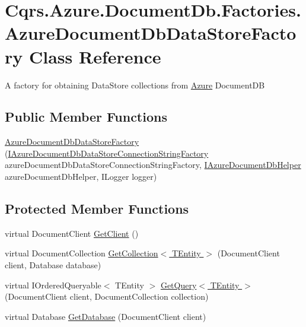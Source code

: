 \hypertarget{classCqrs_1_1Azure_1_1DocumentDb_1_1Factories_1_1AzureDocumentDbDataStoreFactory}{}\section{Cqrs.\+Azure.\+Document\+Db.\+Factories.\+Azure\+Document\+Db\+Data\+Store\+Factory Class Reference}
\label{classCqrs_1_1Azure_1_1DocumentDb_1_1Factories_1_1AzureDocumentDbDataStoreFactory}


A factory for obtaining Data\+Store collections from \hyperlink{namespaceCqrs_1_1Azure}{Azure} Document\+DB  


\subsection*{Public Member Functions}
\begin{DoxyCompactItemize}
\item 
\hyperlink{classCqrs_1_1Azure_1_1DocumentDb_1_1Factories_1_1AzureDocumentDbDataStoreFactory_a7bafe0acfcbb5eaacb5cd2714c39fa08}{Azure\+Document\+Db\+Data\+Store\+Factory} (\hyperlink{interfaceCqrs_1_1Azure_1_1DocumentDb_1_1Factories_1_1IAzureDocumentDbDataStoreConnectionStringFactory}{I\+Azure\+Document\+Db\+Data\+Store\+Connection\+String\+Factory} azure\+Document\+Db\+Data\+Store\+Connection\+String\+Factory, \hyperlink{interfaceCqrs_1_1Azure_1_1DocumentDb_1_1IAzureDocumentDbHelper}{I\+Azure\+Document\+Db\+Helper} azure\+Document\+Db\+Helper, I\+Logger logger)
\end{DoxyCompactItemize}
\subsection*{Protected Member Functions}
\begin{DoxyCompactItemize}
\item 
virtual Document\+Client \hyperlink{classCqrs_1_1Azure_1_1DocumentDb_1_1Factories_1_1AzureDocumentDbDataStoreFactory_a4e7ff98b4f48fdc078a12f97c39d1bbb}{Get\+Client} ()
\item 
virtual Document\+Collection \hyperlink{classCqrs_1_1Azure_1_1DocumentDb_1_1Factories_1_1AzureDocumentDbDataStoreFactory_ad0a8f33b95b2ffba1d8bb86db389d327}{Get\+Collection$<$ T\+Entity $>$} (Document\+Client client, Database database)
\item 
virtual I\+Ordered\+Queryable$<$ T\+Entity $>$ \hyperlink{classCqrs_1_1Azure_1_1DocumentDb_1_1Factories_1_1AzureDocumentDbDataStoreFactory_a8064c08a0b784283199bf8c0b94675e6}{Get\+Query$<$ T\+Entity $>$} (Document\+Client client, Document\+Collection collection)
\item 
virtual Database \hyperlink{classCqrs_1_1Azure_1_1DocumentDb_1_1Factories_1_1AzureDocumentDbDataStoreFactory_a0d010038f250f91446b9d94277c02c44}{Get\+Database} (Document\+Client client)
\end{DoxyCompactItemize}
